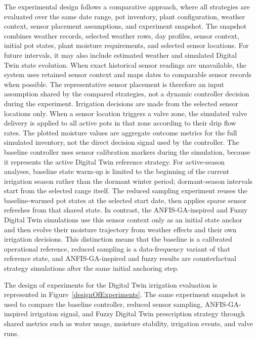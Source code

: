 \par The experimental design follows a comparative approach, where all strategies are
    evaluated over the same date range, pot inventory, plant configuration, weather
    context, sensor placement assumptions, and experiment snapshot. The snapshot combines
    weather records, selected weather rows, day profiles, sensor context, initial pot
    states, plant moisture requirements, and selected sensor locations. For future
    intervals, it may also include estimated weather and simulated Digital Twin state
    evolution. When exact historical sensor readings are unavailable, the system uses
    retained sensor context and maps dates to comparable sensor records when possible. The
    representative sensor placement is therefore an input assumption shared by the
    compared strategies, not a dynamic controller decision during the experiment.
    Irrigation decisions are made from the selected sensor locations only. When a sensor
    location triggers a valve zone, the simulated valve delivery is applied to all active
    pots in that zone according to their drip flow rates. The plotted moisture values are
    aggregate outcome metrics for the full simulated inventory, not the direct decision
    signal used by the controller. The baseline controller uses sensor calibration
    markers during the simulation, because it represents the active Digital Twin
    reference strategy. For active-season analyses, baseline state warm-up is limited to
    the beginning of the current irrigation season rather than the dormant winter period;
    dormant-season intervals start from the selected range itself. The reduced sampling
    experiment reuses the baseline-warmed pot states at the selected start date, then
    applies sparse sensor refreshes from that shared state. In contrast, the
    ANFIS-GA-inspired and Fuzzy Digital Twin simulations use this sensor context only as
    an initial state anchor and then evolve their moisture trajectory from weather
    effects and their own irrigation decisions. This distinction means that the baseline
    is a calibrated operational reference, reduced sampling is a data-frequency variant
    of that reference state, and ANFIS-GA-inspired and fuzzy results are counterfactual
    strategy simulations after the same initial anchoring step.

\par The design of experiments for the Digital Twin irrigation evaluation is represented
    in Figure~\ref{designOfExperiments}. The same experiment snapshot is used to compare
    the baseline controller, reduced sensor sampling, ANFIS-GA-inspired irrigation signal,
    and Fuzzy Digital Twin prescription strategy through shared metrics such as water
    usage, moisture stability, irrigation events, and valve runs.

